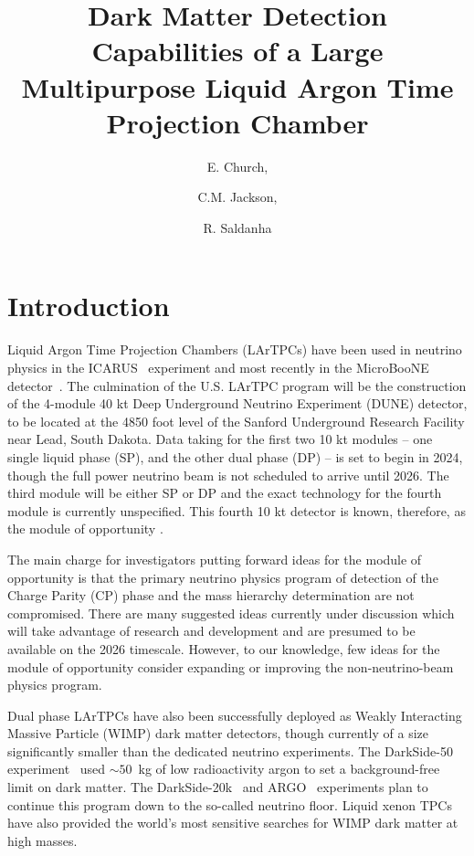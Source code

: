 \documentclass[a4paper,11pt]{article}
\title{Dark Matter Detection Capabilities of a Large Multipurpose Liquid Argon Time Projection Chamber}
\author{E. Church,} %
\author{C.M. Jackson,}
\author{R. Saldanha}
\affiliation{Pacific Northwest National Laboratory, Richland, WA 99354}
\begin{document}
\setcounter{tocdepth}{2}
\maketitle
\flushbottom

\section{Introduction}
\label{sec:intro}

Liquid Argon Time Projection Chambers (LArTPCs) have been used in neutrino physics in the ICARUS~\cite{ICARUS} experiment and most recently in the MicroBooNE detector~\cite{MicroB}. The culmination of the U.S. LArTPC program will be the construction of the 4-module 40 kt Deep Underground Neutrino Experiment (DUNE) detector, to be located at the 4850 foot level of the Sanford Underground Research Facility near Lead, South Dakota. Data taking for the first two 10 kt modules -- one single liquid phase (SP), and the other dual phase (DP) -- is set to begin in 2024, though the full power neutrino beam is not scheduled to arrive until 2026. The third module will be either SP or DP and the exact technology for the fourth module is currently unspecified. This fourth 10 kt detector is known, therefore, as the module of opportunity \cite{dune_mood}. 

The main charge for investigators putting forward ideas for the module of opportunity is that the primary neutrino physics program of detection of the Charge Parity (CP) phase and the mass hierarchy determination are not compromised.  There are many suggested ideas currently under discussion which will take advantage of research and development and are presumed to be available on the 2026 timescale. However, to our knowledge, few ideas for the module of opportunity consider expanding or improving the non-neutrino-beam physics program. 

Dual phase LArTPCs have also been successfully deployed as Weakly Interacting Massive Particle (WIMP) dark matter detectors, though currently of a size significantly smaller than the dedicated neutrino experiments. The DarkSide-50 experiment~\cite{agnes2018darkside} used $\sim 50$~kg of low radioactivity argon to set a background-free limit on dark matter. The DarkSide-20k~\cite{darkside20k} and ARGO~\cite{darkside20k}  experiments plan to continue this program down to the so-called neutrino floor. Liquid xenon TPCs~\cite{xenon1t} have also provided the world's most sensitive searches for WIMP dark matter at high masses.
\end{document}
